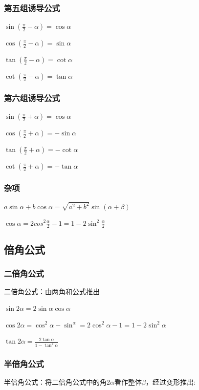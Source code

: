 \documentclass[UTF8]{ctexbook}
\begin{document}
{{{  \subsubsection{第五组诱导公式}{
    $\sin(\frac{\pi}{2} - \alpha) = \cos\alpha$

    $\cos(\frac{\pi}{2} - \alpha) = \sin\alpha$

    $\tan(\frac{\pi}{2} - \alpha) = \cot\alpha$

    $\cot(\frac{\pi}{2} - \alpha) = \tan\alpha$
  }%

  \subsubsection{第六组诱导公式}{
    $\sin(\frac{\pi}{2} + \alpha) = \cos\alpha$

    $\cos(\frac{\pi}{2} + \alpha) = -\sin\alpha$

    $\tan(\frac{\pi}{2} + \alpha) = -\cot\alpha$

    $\cot(\frac{\pi}{2} + \alpha) = -\tan\alpha$
  }%

  \subsubsection{杂项}{
    $a\sin\alpha + b\cos\alpha = \sqrt{a^2 + b^2}\sin(\alpha+\beta)$

    $\cos\alpha = 2cos^2\frac{\alpha}{2} - 1 = 1-2\sin^2\frac{\alpha}{2}$
  }%

}%

\subsection{倍角公式}{

\subsubsection{二倍角公式}{
  二倍角公式：由两角和公式推出

  $\sin2\alpha = 2\sin\alpha\cos\alpha$

  $\cos2\alpha = \cos^2\alpha - \sin^\alpha = 2\cos^2\alpha - 1 = 1 - 2\sin^2\alpha$

  $\tan2\alpha = \frac{2\tan\alpha}{1 - \tan^2\alpha}$
}%

\subsubsection{半倍角公式}{
  半倍角公式：将二倍角公式中的角$2\alpha$看作整体$\beta$，经过变形推出:

}}}}
\end{document}
